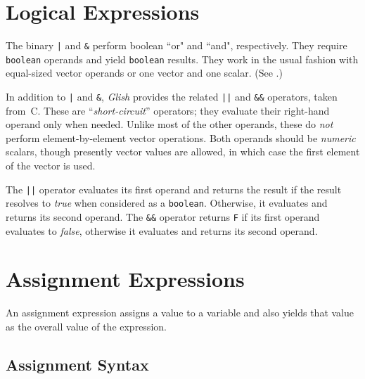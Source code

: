 \section{Logical Expressions}

The binary \verb+|+ and {\tt \&} perform boolean ``or" and ``and",
respectively.  They require {\tt boolean} operands and yield {\tt boolean}
results.  They work in the usual fashion with equal-sized vector
operands or one vector and one scalar.  (See .)

\label{short-circuit}

In addition to \verb+|+ and {\tt \&}, {\em Glish} provides the related
\verb+||+
and {\tt \&\&}
operators, taken from~C.  These are
``{\em short-circuit}'' operators; they evaluate their right-hand operand
only when needed.  Unlike most of the other operands, these do {\em not}
perform element-by-element vector operations.  Both operands should be
{\em numeric} scalars, though presently vector values are allowed, in
which case the first element of the vector is used.

The \verb+||+ operator evaluates its first operand and returns the result
if the result resolves to {\em true} when considered as a {\tt boolean}.
Otherwise, it evaluates and returns its second operand.  The \verb+&&+ operator
returns {\tt F} if its first operand evaluates to {\em false}, otherwise it
evaluates and returns its second operand.

\section{Assignment Expressions}
\label{assignment}

An assignment expression assigns a value to a variable and also yields
that value as the overall value of the expression.

\subsection{Assignment Syntax}

